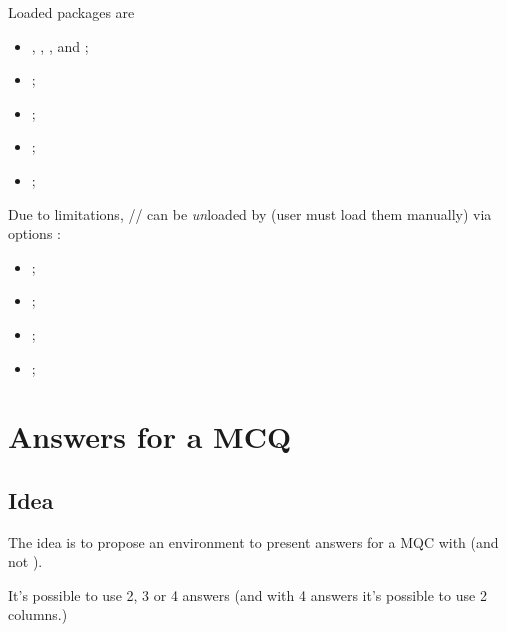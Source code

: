 \documentclass[english,11pt,a4paper]{article}
\begin{document}
Loaded packages are 

\begin{itemize}
	\item {}, , ,  and  ;
	\item {} ;
	\item {} ;
	\item {} ;
	\item {} ;
\end{itemize}

Due to limitations, // can be \textit{un}loaded by  (user must load them manually) via options :

\begin{itemize}
	\item {} ;
	\item {} ;
	\item {} ;
	\item {} ;
\end{itemize}

\begin{codehigh}[language=latex/latex3,style/main=teal!25,style/code=teal!25]
\usepackage{customenvs}

\usepackage[option(s)]{customenvs}
\end{codehigh}

\newpage

\section{Answers for a MCQ}

\subsection{Idea}

The idea is to propose an environment to present answers for a MQC with  (and not ).

\smallskip

It's possible to use 2, 3 or 4 answers (and with 4 answers it's possible to use 2 columns.)
\end{document}
